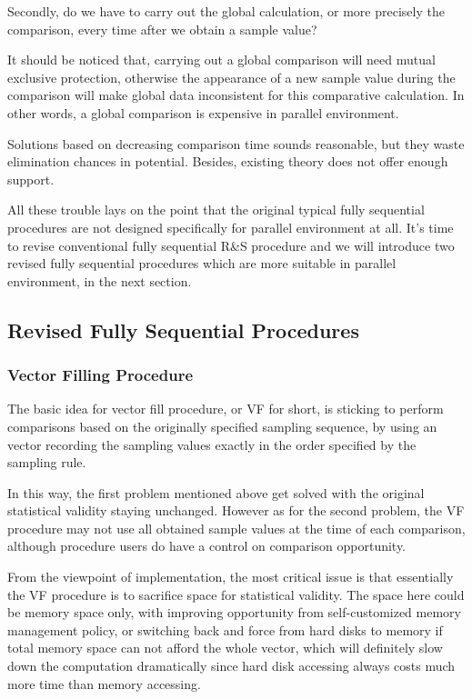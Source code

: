 \documentclass[12pt,a4paper]{report}
\begin{document}
Secondly, do we have to carry out the global calculation, or more precisely the comparison, every time after we obtain a sample value?

It should be noticed that, carrying out a global comparison will need mutual exclusive protection, otherwise the appearance of a new sample value during the comparison will make global data inconsistent for this comparative calculation. In other words, a global comparison is expensive in parallel environment.

Solutions based on decreasing comparison time sounds reasonable, but they waste elimination chances in potential. Besides, existing theory does not offer enough support.

All these trouble lays on the point that the original typical fully sequential procedures are not designed specifically for parallel environment at all. It's time to revise conventional fully sequential R\&S procedure and we will introduce two revised fully sequential procedures which are more suitable in parallel environment, in the next section.

\subsection{Revised Fully Sequential Procedures}

\subsubsection{Vector Filling Procedure}

The basic idea for vector fill procedure, or VF for short, is sticking to perform comparisons based on the originally specified sampling sequence, by using an vector recording the sampling values exactly in the order specified by the sampling rule.

In this way, the first problem mentioned above get solved with the original statistical validity staying unchanged. However as for the second problem, the VF procedure may not use all obtained sample values at the time of each comparison, although procedure users do have a control on comparison opportunity.

From the viewpoint of implementation, the most critical issue is that essentially the VF procedure is to sacrifice space for statistical validity. The space here could be memory space only, with improving opportunity from self-customized memory management policy, or switching back and force from hard disks to memory if total memory space can not afford the whole vector, which will definitely slow down the computation dramatically since hard disk accessing always costs much more time than memory accessing.
\end{document}
